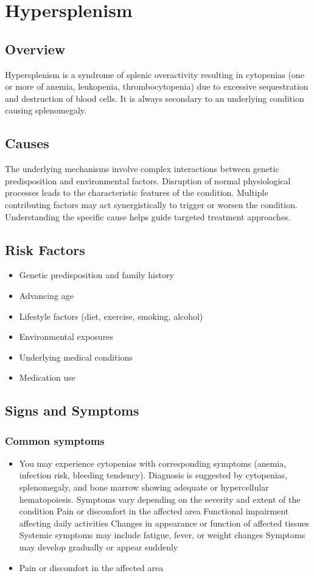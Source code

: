 \chapter{Hypersplenism}
\label{sec:Hypersplenism}

\section{Overview}
Hypersplenism is a syndrome of splenic overactivity resulting in cytopenias (one or more of anemia, leukopenia, thrombocytopenia) due to excessive sequestration and destruction of blood cells. It is always secondary to an underlying condition causing splenomegaly.
\section{Causes}
The underlying mechanisms involve complex interactions between genetic predisposition and environmental factors. Disruption of normal physiological processes leads to the characteristic features of the condition. Multiple contributing factors may act synergistically to trigger or worsen the condition. Understanding the specific cause helps guide targeted treatment approaches.
\section{Risk Factors}


\begin{itemize}[noitemsep]
  \item Genetic predisposition and family history
  \item Advancing age
  \item Lifestyle factors (diet, exercise, smoking, alcohol)
  \item Environmental exposures
  \item Underlying medical conditions
  \item Medication use
\end{itemize}
\section{Signs and Symptoms}

\subsection{Common symptoms}
\begin{itemize}[noitemsep]
  \item You may experience cytopenias with corresponding symptoms (anemia, infection risk, bleeding tendency). Diagnosis is suggested by cytopenias, splenomegaly, and bone marrow showing adequate or hypercellular hematopoiesis. Symptoms vary depending on the severity and extent of the condition Pain or discomfort in the affected area Functional impairment affecting daily activities Changes in appearance or function of affected tissues Systemic symptoms may include fatigue, fever, or weight changes Symptoms may develop gradually or appear suddenly
  \item Pain or discomfort in the affected area
  \end{itemize}

